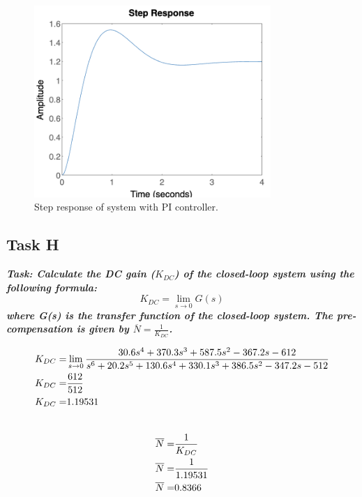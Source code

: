 \begin{figure}[h!]
    \centering
    \includegraphics[width = 0.8\textwidth]{Images/2G_Step.png}
    \caption{Step response of system with PI controller.}
    \label{fig:2G_Step}
\end{figure}

\subsection{Task H}
\textbf{\textit{Task: Calculate the DC gain ($K_{DC}$) of the closed-loop system using the following formula:}}
\begin{equation}
    K_{DC} = \lim_{s \to 0} G(s)
\end{equation}
\textbf{\textit{where G(s) is the transfer function of the closed-loop system. The pre-compensation is given
by $\overline{N} = \frac {1}{K_{DC}}$.}}


\begin{align*}
     K_{DC} =&  \lim_{s \to 0} \frac{30.6s^4 + 370.3s^3 + 587.5s^2 - 367.2s - 612}{s^6 + 20.2s^5 + 130.6s^4 + 330.1s^3 + 386.5s^2 - 347.2s - 512} \\
     \newline
     K_{DC} =&  \frac{612}{512} \\
     \newline
     K_{DC} =& 1.19531 \\
     \newline
\end{align*}

\begin{align*}
    \overline{N} =& \frac{1}{K_{DC}} \\
     \newline
     \overline{N} =& \frac{1}{1.19531} \\
     \newline
     \overline{N} =& 0.8366
\end{align*}

